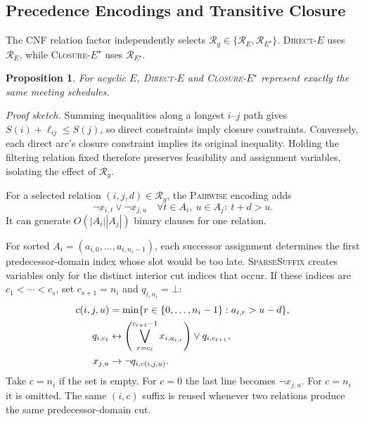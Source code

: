 \documentclass[conference,a4paper]{IEEEtran}
\newcommand{\revised}[1]{#1}
\newtheorem{proposition}{Proposition}
\begin{document}
\subsection{Precedence Encodings and Transitive Closure}
\label{sec:precedence-encoding}

The CNF relation factor independently selects $\mathcal R_g\in\{\mathcal R_E,\mathcal R_{E^\star}\}$. \mbox{\textnormal{\textsc{Direct-}}\ensuremath{E}} uses $\mathcal R_E$, while \mbox{\textnormal{\textsc{Closure-}}\ensuremath{E^\star}} uses $\mathcal R_{E^\star}$.

\begin{proposition}
\label{prop:closure-equivalence}
For acyclic $E$, \mbox{\textnormal{\textsc{Direct-}}\ensuremath{E}} and \mbox{\textnormal{\textsc{Closure-}}\ensuremath{E^\star}} represent exactly the same meeting schedules.
\end{proposition}
\revised{\emph{Proof sketch.} Summing inequalities along a longest $i$--$j$ path gives $S(i)+\ell_{ij}\leq S(j)$, so direct constraints imply closure constraints. Conversely, each direct arc's closure constraint implies its original inequality. Holding the filtering relation fixed therefore preserves feasibility and assignment variables, isolating the effect of $\mathcal R_g$.}

For a selected relation $(i,j,d)\in\mathcal R_g$, the \mbox{\textnormal{\textsc{Pairwise}}} encoding adds
\begin{equation}
\neg x_{i,t}\lor\neg x_{j,u}
\quad
\forall t\in A_i,\ u\in A_j:\ t+d>u.
\label{eq:pairwise-precedence}
\end{equation}
It can generate $O(|A_i||A_j|)$ binary clauses for one relation.

For sorted $A_i=(a_{i,0},\ldots,a_{i,n_i-1})$, each successor assignment determines the first predecessor-domain index whose slot would be too late. \mbox{\textnormal{\textsc{SparseSuffix}}} creates variables only for the distinct interior cut indices that occur.  If these indices are $c_1<\cdots<c_s$, set $c_{s+1}=n_i$ and $q_{i,n_i}=\bot$:
\begin{align}
c(i,j,u)&=\min\{r\in\{0,\ldots,n_i-1\}:a_{i,r}>u-d\}, \notag\\
q_{i,c_\ell}&\leftrightarrow
\left(\bigvee_{r=c_\ell}^{c_{\ell+1}-1}x_{i,a_{i,r}}\right)
\lor q_{i,c_{\ell+1}}, \label{eq:sparse-suffix}\\
x_{j,u}&\rightarrow\neg q_{i,c(i,j,u)}.
\label{eq:suffix-link}
\end{align}
Take $c=n_i$ if the set is empty.  For $c=0$ the last line becomes $\neg x_{j,u}$.  For $c=n_i$ it is omitted.  The same $(i,c)$ suffix is reused whenever two relations produce the same predecessor-domain cut.
\end{document}
